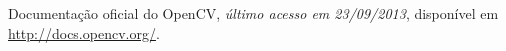 \documentclass[twoside]{article}
\begin{document}
\begin{multicols}{2}





\begin{thebibliography}{99} %


 Documentação oficial do OpenCV, \emph{último acesso em 23/09/2013},  disponível em \\
\url{http://docs.opencv.org/}.




 
\end{thebibliography}


\end{multicols}
\end{document}
